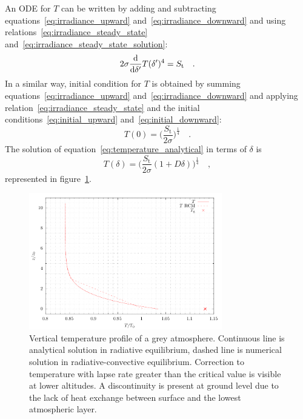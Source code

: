 \documentclass[a4paper,10pt,twocolumn,\classoptions]{article}
\begin{document}
An ODE for $T$ can be written by adding and subtracting equations~\eqref{eq:irradiance_upward} and~\eqref{eq:irradiance_downward} and using relations~\eqref{eq:irradiance_steady_state} and~\eqref{eq:irradiance_steady_state_solution}:
\begin{equation}
  \label{eq:temperature_analytical}
  2 \sigma \odv*{T(\delta')^4}{\delta'} = S_\text{t}
  \quad .
\end{equation}
In a similar way, initial condition for $T$ is obtained by summing equations~\eqref{eq:irradiance_upward} and~\eqref{eq:irradiance_downward} and applying relation~\eqref{eq:irradiance_steady_state} and the initial conditions~\eqref{eq:initial_upward} and~\eqref{eq:initial_downward}:
\begin{equation}
  \label{eq:initial_temperature}
  T(0) = \bigg( \frac{S_\text{t}}{2 \sigma} \bigg)^\frac{1}{4}
  \quad .
\end{equation}
The solution of equation~\eqref{eq:temperature_analytical} in terms of $\delta$ is
\begin{equation}
  \label{eq:temperature_analytical_solution}
  T(\delta) = \bigg( \frac{S_\text{t}}{2 \sigma} (1 + D \delta) \bigg)^\frac{1}{4}
  \quad ,
\end{equation}
represented in figure~\ref{fig:temperature}.
\begin{figure}[h]
  \centering
  \includegraphics*[keepaspectratio=true,width=0.75\textwidth]{temperature}
  \caption{Vertical temperature profile of a grey atmosphere. Continuous line is analytical solution in radiative equilibrium, dashed line is numerical solution in radiative-convective equilibrium. Correction to temperature with lapse rate greater than the critical value is visible at lower altitudes. A discontinuity is present at ground level due to the lack of heat exchange between surface and the lowest atmospheric layer.}
  \label{fig:temperature}
\end{figure}
\end{document}
